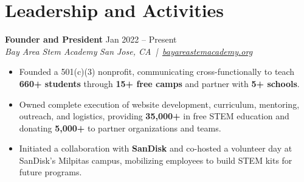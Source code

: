 \documentclass[10pt,letterpaper]{article}
\newif\ifresumeFirstRole
\newcommand{\resumeRole}[4]{%
  \ifresumeFirstRole
    \global\resumeFirstRolefalse
  \else
    \vspace{0pt plus 1fill}%
  \fi
  \textbf{#1} \hfill #2\\
  \textit{#3} \hfill \textit{#4}
}
\begin{document}
\section*{Leadership and Activities}
\resumeRole{Founder and President}{Jan 2022 -- Present}{Bay Area Stem Academy}{San Jose, CA \,|\, \href{https://bayareastemacademy.org}{bayareastemacademy.org}}
\begin{itemize}
  \item Founded a 501(c)(3) nonprofit, communicating cross-functionally to teach \textbf{660+ students} through \textbf{15+ free camps} and partner with \textbf{5+ schools}.
  \item Owned complete execution of website development, curriculum, mentoring, outreach, and logistics, providing \textbf{\textdollar{}35,000+} in free STEM education and donating \textbf{\textdollar{}5,000+} to partner organizations and teams.
  \item Initiated a collaboration with \textbf{SanDisk} and co-hosted a volunteer day at SanDisk's Milpitas campus, mobilizing employees to build STEM kits for future programs.
\end{itemize}
\end{document}
